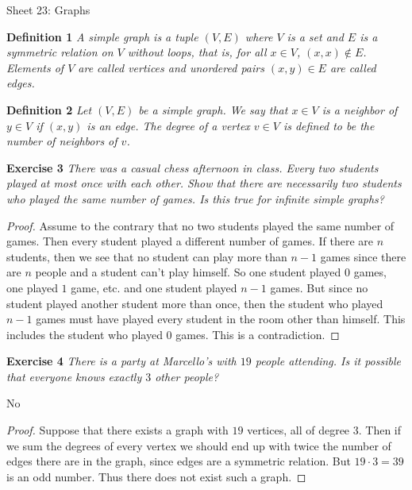 \documentclass{article}
\begin{document}
\begin{flushleft}

\Large

Sheet 23: Graphs\newline

\normalsize

\textbf{Definition 1}
\textsl{A simple graph is a tuple $(V,E)$ where $V$ is a set and $E$ is a symmetric relation on $V$ without loops, that is, for all $x \in V$, $(x,x) \notin E$. Elements of $V$ are called vertices and unordered pairs $(x,y) \in E$ are called edges.}\newline

\textbf{Definition 2}
\textsl{Let $(V,E)$ be a simple graph. We say that $x \in V$ is a neighbor of $y \in V$ if $(x,y)$ is an edge. The degree of a vertex $v \in V$ is defined to be the number of neighbors of $v$.}\newline

\textbf{Exercise 3}
\textsl{There was a casual chess afternoon in class. Every two students played at most once with each other. Show that there are necessarily two students who played the same number of games. Is this true for infinite simple graphs?}
\begin{proof}
Assume to the contrary that no two students played the same number of games. Then every student played a different number of games. If there are $n$ students, then we see that no student can play more than $n-1$ games since there are $n$ people and a student can't play himself. So one student played $0$ games, one played $1$ game, etc. and one student played $n-1$ games. But since no student played another student more than once, then the student who played $n-1$ games must have played every student in the room other than himself. This includes the student who played $0$ games. This is a contradiction.
\end{proof}

\textbf{Exercise 4}
\textsl{There is a party at Marcello's with $19$ people attending. Is it possible that everyone knows exactly $3$ other people?}\newline

No
\begin{proof}
Suppose that there exists a graph with $19$ vertices, all of degree $3$. Then if we sum the degrees of every vertex we should end up with twice the number of edges there are in the graph, since edges are a symmetric relation. But $19\cdot 3 = 39$ is an odd number. Thus there does not exist such a graph.
\end{proof}


\end{flushleft}
\end{document}
